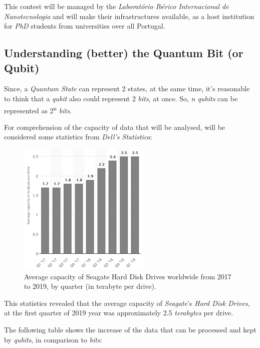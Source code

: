 \documentclass[conference]{IEEEtran}
\begin{document}
This contest will be managed by the \textit{Laborat\'orio Ib\'erico Internacional de Nanotecnologia} and will make their infrastructures available, as a host institution for \textit{PhD} students from universities over all Portugal.

\newpage

\subsection{Understanding (better) the Quantum Bit (or Qubit)}\label{AA}

\vspace{4pt}

Since, a \textit{Quantum State} can represent 2 states, at the same time, it's reasonable to think that a \textit{qubit} also could represent 2 \textit{bits}, at once. So, \textit{n qubits} can be represented as 2\textsuperscript{n} \textit{bits}.

\vspace{4pt}

For comprehension of the capacity of data that will be analysed, will be considered some statistics from \textit{Dell's Statistica}:

\begin{figure}[htbp]
\centerline{\includegraphics{imgs/fig-8.png}}
\caption{Average capacity of Seagate Hard Disk Drives worldwide from 2017 to 2019, by quarter (in terabyte per drive).}
\label{fig}
\end{figure}

This statistics revealed that the average capacity of \textit{Seagate}'s \textit{Hard Disk Drives}, at the first quarter of 2019 year was approximately 2.5 \textit{terabytes} per drive.

\vspace{4pt}

The following table shows the increase of the data that can be processed and kept by \textit{qubits}, in comparison to \textit{bits}:
\end{document}
